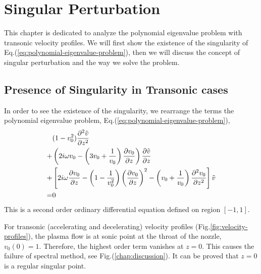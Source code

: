 \chapter{Singular Perturbation} \label{chap:singular-perturbation}
This chapter is dedicated to analyze the polynomial eigenvalue problem with transonic velocity profiles. We will first show the existence of the singularity of Eq.(\ref{eq:polynomial-eigenvalue-problem}), then we will discuss the concept of singular perturbation and the way we solve the problem.

\section{Presence of Singularity in Transonic cases} \label{sec:presence-of-singularity}
In order to see the existence of the singularity, we rearrange the terms the polynomial eigenvalue problem, Eq.(\ref{eq:polynomial-eigenvalue-problem}),
\begin{equation} \label{eq:singular-perturbation-problem}
	\begin{aligned}
		  & (1-v_0^2)\pdv[2]{\tilde{v}}{z}                                                                                                                             \\
		+ & \left(2i\omega v_0 - \left(3v_0 + \frac{1}{v_0}\right)\pdv{v_0}{z}\right)\pdv{\tilde{v}}{z}                                                                \\
		+ & \left[2i\omega\pdv{v_0}{z} -\left(1 - \frac{1}{v_0^2}\right)\left(\pdv{v_0}{z}\right)^2 - \left(v_0 + \frac{1}{v_0}\right)\pdv[2]{v_0}{z} \right]\tilde{v} \\
		= & 0
	\end{aligned}
\end{equation}
This is a second order ordinary differential equation defined on region $[-1,1]$.

For transonic (accelerating and decelerating) velocity profiles (Fig.\ref{fig:velocity-profiles}), the plasma flow is at sonic point at the throat of the nozzle, $v_0(0)=1$. Therefore, the highest order term vanishes at $z=0$. This causes the failure of spectral method, see Fig.(\ref{chap:discussion}). It can be proved that $z=0$ is a regular singular point.

